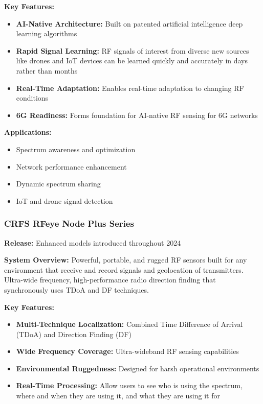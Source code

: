 \documentclass[14pt]{book}
\begin{document}
\textbf{Key Features:}
\begin{itemize}
	\item \textbf{AI-Native Architecture:} Built on patented artificial intelligence deep learning algorithms
	\item \textbf{Rapid Signal Learning:} RF signals of interest from diverse new sources like drones and IoT devices can be learned quickly and accurately in days rather than months
	\item \textbf{Real-Time Adaptation:} Enables real-time adaptation to changing RF conditions
	\item \textbf{6G Readiness:} Forms foundation for AI-native RF sensing for 6G networks
\end{itemize}

\textbf{Applications:}
\begin{itemize}
	\item Spectrum awareness and optimization
	\item Network performance enhancement
	\item Dynamic spectrum sharing
	\item IoT and drone signal detection
\end{itemize}

\subsubsection{CRFS RFeye Node Plus Series}
\textbf{Release:} Enhanced models introduced throughout 2024

\textbf{System Overview:} Powerful, portable, and rugged RF sensors built for any environment that receive and record signals and geolocation of transmitters. Ultra-wide frequency, high-performance radio direction finding that synchronously uses TDoA and DF techniques.

\textbf{Key Features:}
\begin{itemize}
	\item \textbf{Multi-Technique Localization:} Combined Time Difference of Arrival (TDoA) and Direction Finding (DF)
	\item \textbf{Wide Frequency Coverage:} Ultra-wideband RF sensing capabilities
	\item \textbf{Environmental Ruggedness:} Designed for harsh operational environments
	\item \textbf{Real-Time Processing:} Allow users to see who is using the spectrum, where and when they are using it, and what they are using it for
\end{itemize}
\end{document}
